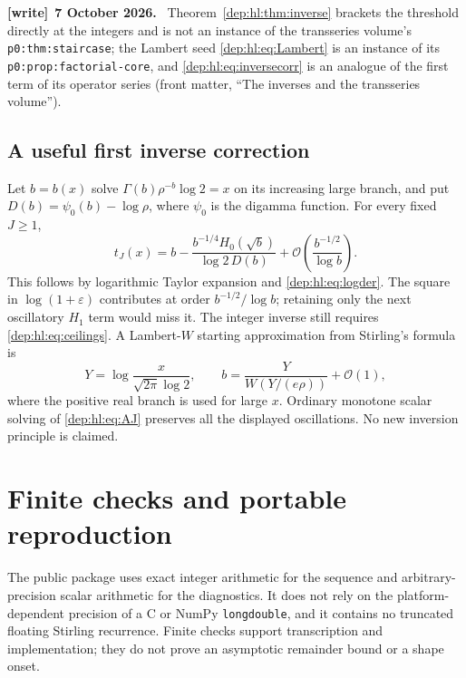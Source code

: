 \documentclass[11pt]{article}
\theoremstyle{definition}\newtheorem{definition}[theorem]{Definition}
\theoremstyle{remark}\newtheorem{remark}[theorem]{Remark}
\newcommand{\OO}{\mathcal O}
\newcommand{\file}[1]{\nolinkurl{#1}}
\newenvironment{writenote}[1][]{\par\smallskip\begingroup\small
 \noindent\textbf{[write]}\if\relax\detokenize{#1}\relax\else~\textbf{#1.}\fi\ }%
 {\par\endgroup\smallskip}
\begin{document}
\begin{writenote}[7 October 2026]
Theorem~\ref{dep:hl:thm:inverse} brackets the threshold directly at the integers and is not an instance of the transseries volume's \file{p0:thm:staircase}; the Lambert seed \eqref{dep:hl:eq:Lambert} is an instance of its \file{p0:prop:factorial-core}, and \eqref{dep:hl:eq:inversecorr} is an analogue of the first term of its operator series (front matter, ``The inverses and the transseries volume'').
\end{writenote}

\subsection{A useful first inverse correction}
Let $b=b(x)$ solve
$\Gamma(b)\rho^{-b}\log 2=x$ on its increasing large branch, and put
$D(b)=\psi_0(b)-\log\rho$, where $\psi_0$ is the digamma function.
For every fixed $J\ge1$,
\begin{equation}\label{dep:hl:eq:inversecorr}
 t_J(x)=b-\frac{b^{-1/4}H_0(\sqrt b)}{\log 2\,D(b)}
               +\OO\left(\frac{b^{-1/2}}{\log b}\right).
\end{equation}
This follows by logarithmic Taylor expansion and \eqref{dep:hl:eq:logder}.
The square in $\log(1+\varepsilon)$ contributes at order
$b^{-1/2}/\log b$; retaining only the next oscillatory $H_1$ term
would miss it. The integer inverse still requires \eqref{dep:hl:eq:ceilings}.
A Lambert-$W$ starting approximation from Stirling's formula is
\begin{equation}\label{dep:hl:eq:Lambert}
 Y=\log\frac{x}{\sqrt{2\pi}\log2},\qquad
 b=\frac{Y}{W(Y/(e\rho))}+\OO(1),
\end{equation}
where the positive real branch is used for large $x$.
Ordinary monotone scalar solving of \eqref{dep:hl:eq:AJ} preserves all the
displayed oscillations. No new inversion principle is claimed.

\section{Finite checks and portable reproduction}\label{dep:hl:sec:checks}
The public package uses exact integer arithmetic for the sequence and
arbitrary-precision scalar arithmetic for the diagnostics. It does not
rely on the platform-dependent precision of a C or NumPy
\texttt{longdouble}, and it contains no truncated floating Stirling
recurrence. Finite checks support transcription and implementation;
they do not prove an asymptotic remainder bound or a shape onset.
\end{document}
